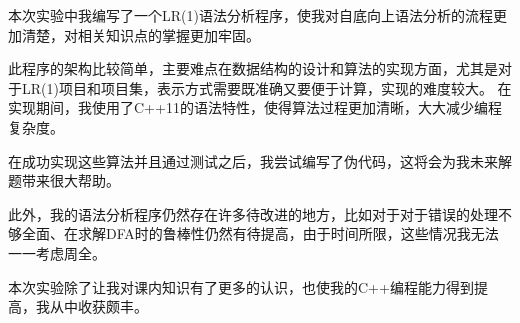 \documentclass[lang=cn,11pt,a4paper,cite=authornum]{paper}
\begin{document}
本次实验中我编写了一个LR(1)语法分析程序，使我对自底向上语法分析的流程更加清楚，对相关知识点的掌握更加牢固。

此程序的架构比较简单，主要难点在数据结构的设计和算法的实现方面，尤其是对于LR(1)项目和项目集，表示方式需要既准确又要便于计算，实现的难度较大。
在实现期间，我使用了C++11的语法特性，使得算法过程更加清晰，大大减少编程复杂度。

在成功实现这些算法并且通过测试之后，我尝试编写了伪代码，这将会为我未来解题带来很大帮助。

此外，我的语法分析程序仍然存在许多待改进的地方，比如对于对于错误的处理不够全面、在求解DFA时的鲁棒性仍然有待提高，由于时间所限，这些情况我无法一一考虑周全。

本次实验除了让我对课内知识有了更多的认识，也使我的C++编程能力得到提高，我从中收获颇丰。
\end{document}
